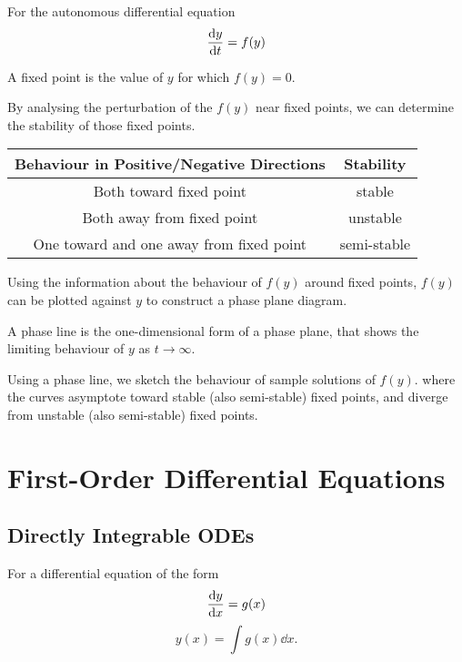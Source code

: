 \documentclass{article}
\begin{document}
For the autonomous differential equation
\begin{equation*}
    \dv{y}{t} = f(y)
\end{equation*}
\begin{definition}
    A fixed point is the value of $y$ for which $f(y) = 0$.
\end{definition}
\begin{definition}[Stability]
    By analysing the perturbation of the $f(y)$ near fixed points, we can determine the
    stability of those fixed points.
    \begin{table}[H]
        \centering
        \begin{tabular}{c | c}
            \toprule
            \textbf{Behaviour in Positive/Negative Directions} & \textbf{Stability} \\
            \midrule
            Both toward fixed point & stable \\
            Both away from fixed point & unstable \\
            One toward and one away from fixed point & semi-stable \\
            \bottomrule
        \end{tabular}
    \end{table}
\end{definition}
\begin{definition}
    Using the information about the behaviour of $f(y)$ around fixed points, $f(y)$ can be plotted against $y$
    to construct a phase plane diagram.
\end{definition}
\begin{definition}
    A phase line is the one-dimensional form of a phase plane,
    that shows the limiting behaviour of $y$ as $t \to \infty$.
\end{definition}
\begin{definition}
    Using a phase line, we sketch the behaviour of sample solutions of $f(y)$.
    where the curves asymptote toward stable
    (also semi-stable) fixed points, and diverge from unstable (also semi-stable) fixed points.
\end{definition}
\newpage
\section{First-Order Differential Equations}
\subsection{Directly Integrable ODEs}
For a differential equation of the form
\begin{equation*}
    \dv{y}{x} = g(x)
\end{equation*}
\begin{equation*}
    y(x) = \int g(x) \dd{x}.
\end{equation*}
\end{document}

